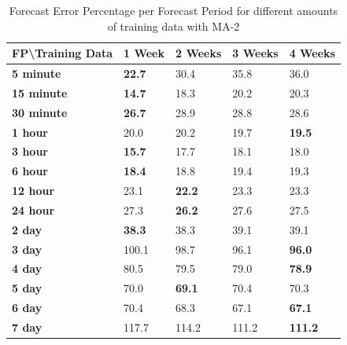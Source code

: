 \documentclass[journal]{IEEEtran}
\begin{document}
\begin{table}[htpb]
  \centering
  \caption{Forecast Error Percentage per Forecast Period for different amounts of training data with MA-2}
\begin{tabular}{|l|l|l|l|l|}
\hline
\textbf{FP\textbackslash{}Training Data} & \textbf{1 Week} & \textbf{2 Weeks} & \textbf{3 Weeks} & \textbf{4 Weeks} \\ \hline
\textbf{5 minute}                        & \textbf{22.7}   & 30.4             & 35.8             & 36.0             \\ \hline
\textbf{15 minute}                       & \textbf{14.7}   & 18.3             & 20.2             & 20.3             \\ \hline
\textbf{30 minute}                       & \textbf{26.7}   & 28.9             & 28.8             & 28.6             \\ \hline
\textbf{1 hour}                          & 20.0            & 20.2             & 19.7             & \textbf{19.5}    \\ \hline
\textbf{3 hour}                          & \textbf{15.7}   & 17.7             & 18.1             & 18.0             \\ \hline
\textbf{6 hour}                          & \textbf{18.4}   & 18.8             & 19.4             & 19.3             \\ \hline
\textbf{12 hour}                         & 23.1            & \textbf{22.2}    & 23.3             & 23.3             \\ \hline
\textbf{24 hour}                         & 27.3            & \textbf{26.2}    & 27.6             & 27.5             \\ \hline
\textbf{2 day}                           & \textbf{38.3}   & 38.3             & 39.1             & 39.1             \\ \hline
\textbf{3 day}                           & 100.1           & 98.7             & 96.1             & \textbf{96.0}    \\ \hline
\textbf{4 day}                           & 80.5            & 79.5             & 79.0             & \textbf{78.9}    \\ \hline
\textbf{5 day}                           & 70.0            & \textbf{69.1}    & 70.4             & 70.3             \\ \hline
\textbf{6 day}                           & 70.4            & 68.3             & 67.1             & \textbf{67.1}    \\ \hline
\textbf{7 day}                           & 117.7           & 114.2            & 111.2            & \textbf{111.2}   \\ \hline
\end{tabular}
\label{tab5}
\end{table}
\end{document}
